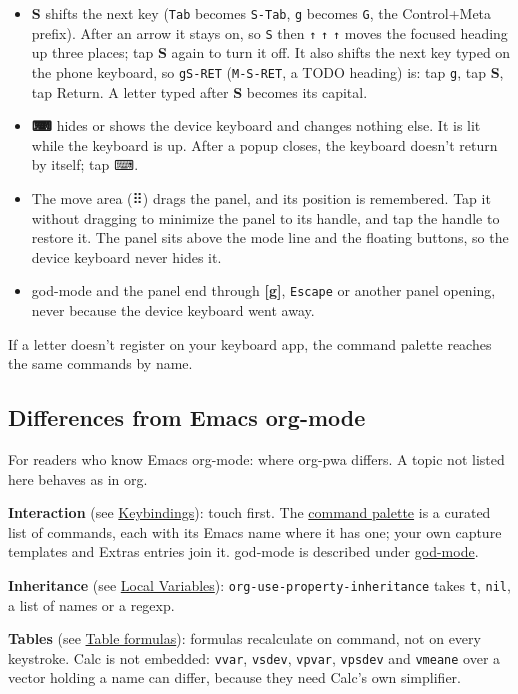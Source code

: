 \documentclass[11pt]{article}
\begin{document}
\begin{itemize}
\item \textbf{S} shifts the next key (\texttt{Tab} becomes \texttt{S-Tab}, \texttt{g} becomes \texttt{G}, the Control+Meta prefix). After an arrow it stays on, so \texttt{S} then \texttt{↑} \texttt{↑} \texttt{↑} moves the focused heading up three places; tap \textbf{S} again to turn it off. It also shifts the next key typed on the phone keyboard, so \texttt{gS-RET} (\texttt{M-S-RET}, a TODO heading) is: tap \texttt{g}, tap \textbf{S}, tap Return. A letter typed after \textbf{S} becomes its capital.
\item \textbf{⌨} hides or shows the device keyboard and changes nothing else. It is lit while the keyboard is up. After a popup closes, the keyboard doesn't return by itself; tap ⌨.
\item The move area (⠿) drags the panel, and its position is remembered. Tap it without dragging to minimize the panel to its handle, and tap the handle to restore it. The panel sits above the mode line and the floating buttons, so the device keyboard never hides it.
\item god-mode and the panel end through \textbf{[g]}, \texttt{Escape} or another panel opening, never because the device keyboard went away.
\end{itemize}

If a letter doesn't register on your keyboard app, the command palette reaches the same commands by name.


\subsection{Differences from Emacs org-mode}
\label{sec:org634683a}
For readers who know Emacs org-mode: where org-pwa differs. A topic not listed here behaves as in org.

\textbf{Interaction} (see \hyperref[sec:orga8a12f7]{Keybindings}): touch first. The \hyperref[sec:org55cb874]{command palette} is a curated list of commands, each with its Emacs name where it has one; your own capture templates and Extras entries join it. god-mode is described under \hyperref[sec:orgc091c26]{god-mode}.

\textbf{Inheritance} (see \hyperref[sec:org761a631]{Local Variables}): \texttt{org-use-property-inheritance} takes \texttt{t}, \texttt{nil}, a list of names or a regexp.

\textbf{Tables} (see \hyperref[sec:org7d24a5b]{Table formulas}): formulas recalculate on command, not on every keystroke. Calc is not embedded: \texttt{vvar}, \texttt{vsdev}, \texttt{vpvar}, \texttt{vpsdev} and \texttt{vmeane} over a vector holding a name can differ, because they need Calc's own simplifier.
\end{document}
